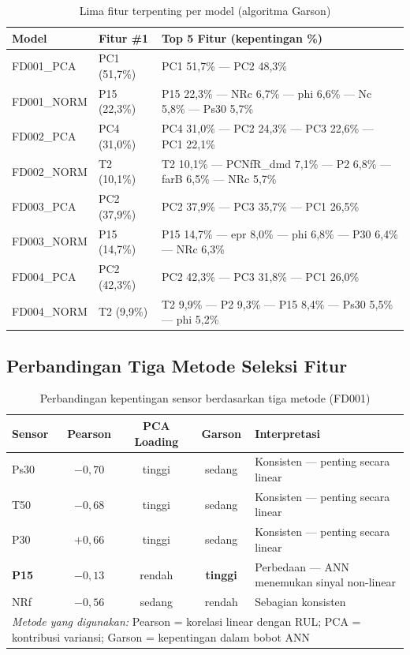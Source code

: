 \documentclass[11pt,a4paper]{article}
\begin{document}
\begin{table}[H]
\centering\small
\caption{Lima fitur terpenting per model (algoritma Garson)}
\label{tab:garson}
\begin{tabular}{llp{9.5cm}}
\toprule
Model & Fitur \#1 & Top 5 Fitur (kepentingan \%) \\
\midrule
FD001\_PCA  & PC1 (51,7\%)
  & PC1 51,7\% --- PC2 48,3\% \\
FD001\_NORM & P15 (22,3\%)
  & P15 22,3\% --- NRc 6,7\% --- phi 6,6\% --- Nc 5,8\% --- Ps30 5,7\% \\
FD002\_PCA  & PC4 (31,0\%)
  & PC4 31,0\% --- PC2 24,3\% --- PC3 22,6\% --- PC1 22,1\% \\
FD002\_NORM & T2 (10,1\%)
  & T2 10,1\% --- PCNfR\_dmd 7,1\% --- P2 6,8\% --- farB 6,5\% --- NRc 5,7\% \\
FD003\_PCA  & PC2 (37,9\%)
  & PC2 37,9\% --- PC3 35,7\% --- PC1 26,5\% \\
FD003\_NORM & P15 (14,7\%)
  & P15 14,7\% --- epr 8,0\% --- phi 6,8\% --- P30 6,4\% --- NRc 6,3\% \\
FD004\_PCA  & PC2 (42,3\%)
  & PC2 42,3\% --- PC3 31,8\% --- PC1 26,0\% \\
FD004\_NORM & T2 (9,9\%)
  & T2 9,9\% --- P2 9,3\% --- P15 8,4\% --- Ps30 5,5\% --- phi 5,2\% \\
\bottomrule
\end{tabular}
\end{table}

\subsection{Perbandingan Tiga Metode Seleksi Fitur}

\begin{table}[H]
\centering\small
\caption{Perbandingan kepentingan sensor berdasarkan tiga metode (FD001)}
\label{tab:three_method}
\begin{tabular}{lcccl}
\toprule
Sensor & Pearson & PCA Loading & Garson & Interpretasi \\
\midrule
Ps30  & $-0{,}70$ & tinggi   & sedang  & Konsisten --- penting secara linear \\
T50   & $-0{,}68$ & tinggi   & sedang  & Konsisten --- penting secara linear \\
P30   & $+0{,}66$ & tinggi   & sedang  & Konsisten --- penting secara linear \\
\textbf{P15}
      & $-0{,}13$ & rendah   & \textbf{tinggi} &
        Perbedaan --- ANN menemukan sinyal non-linear \\
NRf   & $-0{,}56$ & sedang   & rendah  & Sebagian konsisten \\
\midrule
\multicolumn{5}{l}{\small\textit{Metode yang digunakan:}
  Pearson = korelasi linear dengan RUL;
  PCA = kontribusi variansi;
  Garson = kepentingan dalam bobot ANN} \\
\bottomrule
\end{tabular}
\end{table}
\end{document}
